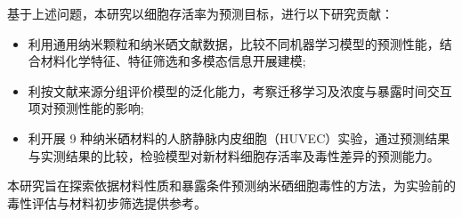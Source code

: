 基于上述问题，本研究以细胞存活率为预测目标，进行以下研究贡献：
\begin{itemize}
\item[1)]利用通用纳米颗粒和纳米硒文献数据，比较不同机器学习模型的预测性能，结合材料化学特征、特征筛选和多模态信息开展建模;
\item[2)]利按文献来源分组评价模型的泛化能力，考察迁移学习及浓度与暴露时间交互项对预测性能的影响;
\item[3)]利开展 9 种纳米硒材料的人脐静脉内皮细胞（HUVEC）实验，通过预测结果与实测结果的比较，检验模型对新材料细胞存活率及毒性差异的预测能力。
\end{itemize}

本研究旨在探索依据材料性质和暴露条件预测纳米硒细胞毒性的方法，为实验前的毒性评估与材料初步筛选提供参考。
